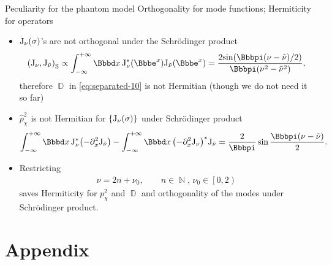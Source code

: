 \documentclass[9pt]{beamer}
\begin{document}
\begin{frame}%
{Peculiarity for the phantom model}%
{Orthogonality for mode functions; Hermiticity for operators}
\begin{itemize}

\item ${\mathrm{J}_{\nu}}\mathopen{}\left(\sigma\right)\mathclose{}$'s are not orthogonal under the 
Schrödinger product
\begin{align}
\rbr{\mathrm{J}_{\nu},\mathrm{J}_{\tilde{\nu}}}_\text{S}
\propto \int_{-\infty}^{+\infty} \dd x\,
\rfun{\mathrm{J}_{\nu}^*}{\ee^x}
\rfun{\mathrm{J}_{\tilde{\nu}}}{\ee^x} =
\frac{2\rfun{\sin}{\pp\rbr{\nu-\tilde{\nu}}/2}}{\pp\rbr{\nu^2-\tilde{\nu}^2}},
\end{align}
therefore $\BbbD$ in \cref{eq:separated-10} is not Hermitian (though we do not 
need it so far)

\item $\widehat{p}_\chi^2$ is not Hermitian for
${\left\{{\mathrm{J}_{\nu}}\mathopen{}\left(\sigma\right)\mathclose{}\right\}}$ under Schrödinger product
\begin{align}
\int_{-\infty}^{+\infty} \dd x\,
\mathrm{J}_{\nu}^*\rbr{-\partial_x^2\mathrm{J}_{\tilde{\nu}}}
-\int_{-\infty}^{+\infty} \dd x\,
\rbr{-\partial_x^2\mathrm{J}_{\nu}}^*\mathrm{J}_{\tilde{\nu}}
= \frac{2}{\pp}\sin\frac{\pp\rbr{\nu-\tilde{\nu}}}{2}.
\end{align}

\item Restricting
\begin{align}
\nu = 2n+\nu_0,\qquad n\in\BbbN,\,\nu_0\in\left[0,2\right)
\end{align}
saves Hermiticity for $p_\chi^2$ and $\BbbD$ and orthogonality of the 
modes under Schrödinger product.

\end{itemize}
\end{frame}



\section*{Appendix}
\end{document}
